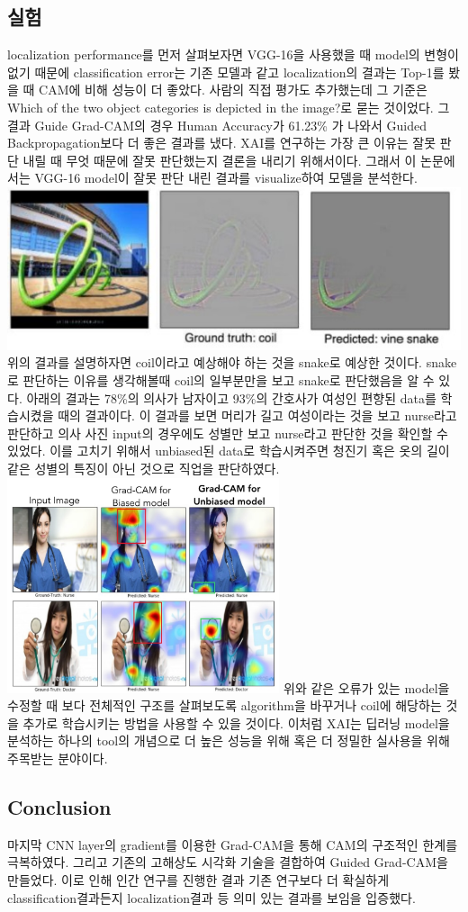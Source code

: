 \documentclass[extendedabs]{bmvc2k}
\begin{document}
 \subsection{실험}
 \quad localization performance를 먼저 살펴보자면 VGG-16을 사용했을 때 model의 변형이 없기 때문에 classification error는 기존 모델과 같고 localization의 결과는 Top-1를 봤을 때
 CAM에 비해 성능이 더 좋았다. 사람의 직접 평가도 추가했는데 그 기준은 Which of the two object categories is depicted in the image?로 묻는 것이었다.
 그 결과 Guide Grad-CAM의 경우 Human Accuracy가 61.23\% 가 나와서  Guided Backpropagation보다 더 좋은 결과를 냈다. XAI를 연구하는 가장 큰 이유는 잘못 판단 내릴 때 무엇 때문에 잘못 판단했는지 결론을 내리기 위해서이다.
 그래서 이 논문에서는 VGG-16 model이 잘못 판단 내린 결과를 visualize하여 모델을 분석한다. 
 \newline  \includegraphics[width=\linewidth]{images/08_CAM.PNG}
 위의 결과를 설명하자면 coil이라고 예상해야 하는 것을 snake로 예상한 것이다. snake로 판단하는 이유를 생각해볼때 coil의 일부분만을 보고 snake로 판단했음을 알 수 있다. 
 아래의 결과는 78\%의 의사가 남자이고 93\%의 간호사가 여성인 편향된 data를 학습시켰을 때의 결과이다. 이 결과를 보면 머리가 길고 여성이라는 것을 보고 nurse라고 판단하고 의사 사진 input의 경우에도 
 성별만 보고 nurse라고 판단한 것을 확인할 수 있었다. 이를 고치기 위해서 unbiased된 data로 학습시켜주면 청진기 혹은 옷의 길이 같은 성별의 특징이 아닌 것으로 직업을 판단하였다.
 \newline  \includegraphics[width=8cm]{images/09_CAM.PNG}
 \newline  위와 같은 오류가 있는 model을 수정할 때 보다 전체적인 구조를 살펴보도록 algorithm을 바꾸거나 coil에 해당하는 것을 추가로 학습시키는 방법을 사용할 수 있을 것이다. 이처럼 XAI는 딥러닝 model을 분석하는 하나의 tool의 개념으로 더 높은 성능을 위해 혹은 더 정밀한 실사용을 위해
 주목받는 분야이다.

 \subsection{Conclusion}
 \quad 마지막 CNN layer의 gradient를 이용한 Grad-CAM을 통해 CAM의 구조적인 한계를 극복하였다. 그리고 기존의 고해상도 시각화 기술을 결합하여 Guided Grad-CAM을 만들었다. 이로 인해 인간 연구를 진행한 결과
 기존 연구보다 더 확실하게 classification결과든지 localization결과 등 의미 있는 결과를 보임을 입증했다. 

\newpage

\end{document}
